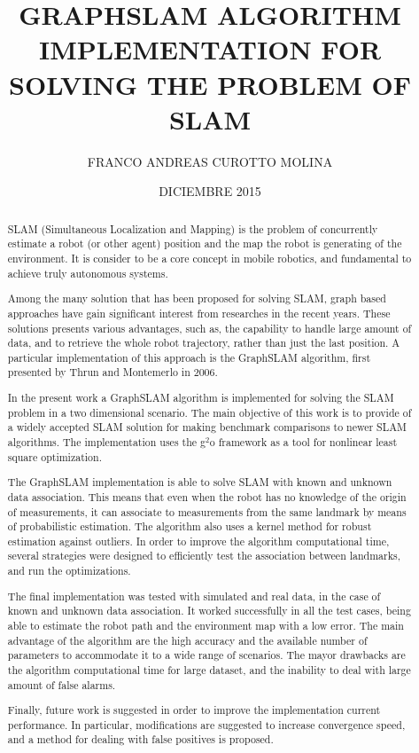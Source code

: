 \documentclass[upright, contnum]{umemoria}
\author{FRANCO ANDREAS CUROTTO MOLINA}
\title{GRAPHSLAM ALGORITHM IMPLEMENTATION FOR SOLVING THE PROBLEM OF SLAM}
\date{DICIEMBRE 2015}
\begin{document}
\frontmatter
\maketitle

\begin{abstract}
SLAM (Simultaneous Localization and Mapping) is the problem of concurrently estimate a robot (or other agent) position and the map the robot is generating of the environment. It is consider to be a core concept in mobile robotics, and fundamental to achieve truly autonomous systems. 

Among the many solution that has been proposed for solving SLAM, graph based approaches have gain significant interest from researches in the recent years. These solutions presents various advantages, such as, the capability to handle large amount of data, and to retrieve the whole robot trajectory, rather than just the last position. A particular implementation of this approach is the GraphSLAM algorithm, first presented by Thrun and Montemerlo in 2006.

In the present work a GraphSLAM algorithm is implemented for solving the SLAM problem in a two dimensional scenario. The main objective of this work is to provide of a widely accepted SLAM solution for making benchmark comparisons to newer SLAM algorithms. The implementation uses the g$^2$o framework as a tool for nonlinear least square optimization.

The GraphSLAM implementation is able to solve SLAM with known and unknown data association. This means that even when the robot has no knowledge of the origin of measurements, it can associate to measurements from the same landmark by means of probabilistic estimation. The algorithm also uses a kernel method for robust estimation against outliers. In order to improve the algorithm computational time, several strategies were designed to efficiently test the association between landmarks, and run the optimizations. 

The final implementation was tested with simulated and real data, in the case of known and unknown data association. It worked successfully in all the test cases, being able to estimate the robot path and the environment map with a low error. The main advantage of the algorithm are the high accuracy and the available number of parameters to accommodate it to a wide range of scenarios. The mayor drawbacks are the algorithm computational time for large dataset, and the inability to deal with large amount of false alarms. 

Finally, future work is suggested in order to improve the implementation current performance. In particular, modifications are suggested to increase convergence speed, and a method for dealing with false positives is proposed.   
\end{abstract}
\end{document}
